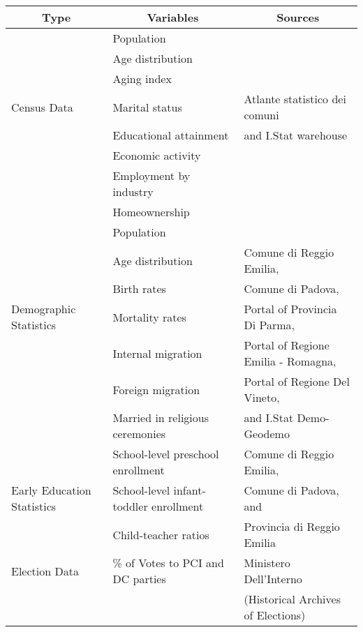 \begin{tabular}{lll}
\toprule
\multicolumn{1}{c}{Type}	&	\multicolumn{1}{c}{Variables}	&	\multicolumn{1}{c}{Sources}	\\
\midrule
			&	Population & \\
			& 	Age distribution & \\
			&	Aging index & \\
Census Data	&	Marital status & Atlante statistico dei comuni\\
			& 	Educational attainment & and I.Stat warehouse\\
			& 	Economic activity & \\
			& 	Employment by industry & \\
			& 	Homeownership	&	\\
\midrule
						&	Population 		&	 \\
						&	Age distribution 	&	Comune di Reggio Emilia, \\
						&	Birth rates 		& 	Comune di Padova, 	\\
	Demographic Statistics	&	Mortality rates 		&	Portal of Provincia Di Parma, \\
						&	Internal migration 	&  	Portal of Regione Emilia - Romagna,\\
						&	Foreign migration 	&	Portal of Regione Del Vineto, \\
						& 	Married in religious ceremonies	& 	and I.Stat Demo-Geodemo \\
\midrule
						&	School-level preschool enrollment	 &	Comune di Reggio Emilia, \\
	Early Education Statistics	& 	School-level infant-toddler enrollment & 	Comune di Padova, and \\
						& 	Child-teacher ratios				&	 Provincia di Reggio Emilia \\
\midrule
Election Data				&	\% of Votes to PCI and DC parties 	&	Ministero Dell'Interno \\
						&								&	(Historical Archives of Elections)	\\
\bottomrule
\end{tabular}